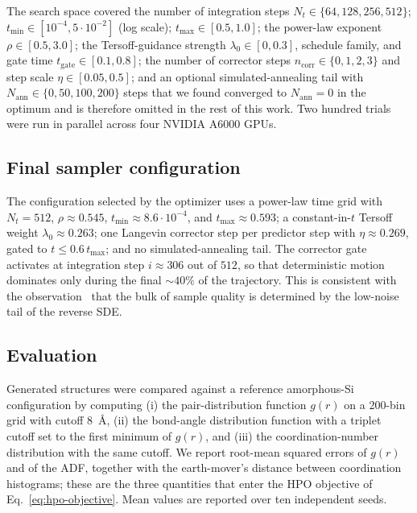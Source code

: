 The search space covered the number of integration steps
$N_t\in\{64,128,256,512\}$; $t_{\min}\in[10^{-4},5\cdot10^{-2}]$ (log scale);
$t_{\max}\in[0.5,1.0]$; the power-law exponent $\rho\in[0.5,3.0]$; the
Tersoff-guidance strength $\lambda_0\in[0,0.3]$, schedule family, and gate
time $t_{\mathrm{gate}}\in[0.1,0.8]$; the number of corrector steps
$n_{\mathrm{corr}}\in\{0,1,2,3\}$ and step scale $\eta\in[0.05,0.5]$; and an
optional simulated-annealing tail with $N_{\mathrm{ann}}\in\{0,50,100,200\}$
steps that we found converged to $N_{\mathrm{ann}}=0$ in the optimum and is
therefore omitted in the rest of this work. Two hundred trials were run in
parallel across four NVIDIA A6000 GPUs.

\subsection{Final sampler configuration}
\label{sec:final-config}

The configuration selected by the optimizer uses a power-law time grid with
$N_t=512$, $\rho\approx 0.545$, $t_{\min}\approx 8.6\cdot10^{-4}$, and
$t_{\max}\approx 0.593$; a constant-in-$t$ Tersoff weight $\lambda_0\approx
0.263$; one Langevin corrector step per predictor step with $\eta\approx
0.269$, gated to $t\le 0.6\,t_{\max}$; and no simulated-annealing tail. The
corrector gate activates at integration step $i\approx 306$ out of $512$, so
that deterministic motion dominates only during the final $\sim\!40\%$ of
the trajectory. This is consistent with the observation~\cite{karras2022edm}
that the bulk of sample quality is determined by the low-noise tail of the
reverse SDE.

\subsection{Evaluation}
\label{sec:eval}

Generated structures were compared against a reference amorphous-Si
configuration by computing (i) the pair-distribution function $g(r)$ on a
200-bin grid with cutoff $8$~\AA, (ii) the bond-angle distribution function
with a triplet cutoff set to the first minimum of $g(r)$, and (iii) the
coordination-number distribution with the same cutoff. We report root-mean
squared errors of $g(r)$ and of the ADF, together with the earth-mover's
distance between coordination histograms; these are the three quantities
that enter the HPO objective of Eq.~\eqref{eq:hpo-objective}. Mean values
are reported over ten independent seeds.
